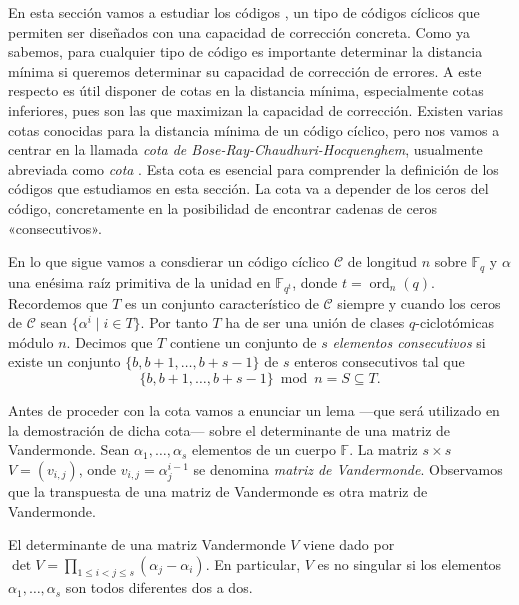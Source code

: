 
En esta sección vamos a estudiar los códigos , un tipo de códigos cíclicos que permiten ser diseñados con una capacidad de corrección concreta.
Como ya sabemos, para cualquier tipo de código es importante determinar la distancia mínima si queremos determinar su capacidad de corrección de errores.
A este respecto es útil disponer de cotas en la distancia mínima, especialmente cotas inferiores, pues son las que maximizan la capacidad de corrección.
Existen varias cotas conocidas para la distancia mínima de un código cíclico, pero nos vamos a centrar en la llamada \textit{cota de Bose-Ray-Chaudhuri-Hocquenghem}, usualmente abreviada como \textit{cota }.
Esta cota es esencial para comprender la definición de los códigos  que estudiamos en esta sección.
La cota  va a depender de los ceros del código, concretamente en la posibilidad de encontrar cadenas de ceros «consecutivos».

En lo que sigue vamos a consdierar un código cíclico \(\mathcal C\)  de longitud \(n\) sobre \(\mathbb F_q\) y \(\alpha\) una enésima raíz primitiva de la unidad en \(\mathbb F_{q^t}\), donde \(t = \operatorname{ord}_n(q)\).
Recordemos que \(T\) es un conjunto característico de \(\mathcal C\) siempre y cuando los ceros de \(\mathcal C\) sean \(\{\alpha^{i} \mid i \in T\}\).
Por tanto \(T\) ha de ser una unión de clases \(q\)-ciclotómicas módulo \(n\).
Decimos que \(T\) contiene un conjunto de \(s\) \textit{elementos consecutivos} si existe un conjunto \(\{b, b + 1, \dots, b + s - 1\}\) de \(s\) enteros consecutivos tal que
\[
  \{b, b + 1, \dots, b + s - 1\} \bmod n = S \subseteq T.
\]

Antes de proceder con la cota  vamos a enunciar un lema —que será utilizado en la demostración de dicha cota— sobre el determinante de una matriz de Vandermonde.
Sean \(\alpha_1, \dots, \alpha_s\) elementos de un cuerpo \(\mathbb F\).
La matriz \(s \times s\) \(V = (v_{i, j})\), onde \(v_{i,j} = \alpha_{j}^{i-1}\) se denomina \textit{matriz de Vandermonde}.
Observamos que la transpuesta de una matriz de Vandermonde es otra matriz de Vandermonde.

\begin{lemma}
  El determinante de una matriz Vandermonde \(V\) viene dado por \(\operatorname{det}V = \prod_{1 \leq i < j \leq s}(\alpha_j - \alpha_i)\).
  En particular, \(V\) es no singular si los elementos \(\alpha_1, \dots, \alpha_s\) son todos diferentes dos a dos.
\end{lemma}

